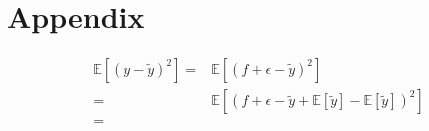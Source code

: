 \onecolumn
\setcounter{equation}{0}
\renewcommand\theequation{A.\arabic{equation}}
\section*{Appendix}
\label{sec:appendix}

\begin{align*}
	\mathds{E}\left[\left(y-\tilde{y}\right)^2\right] =& \mathds{E}\left[\left(f+\epsilon - \tilde{y}\right)^2\right] \\
	=& \mathds{E}\left[\left(f+\epsilon - \tilde{y} + \mathds{E}\left[\tilde{y}\right] - \mathds{E}\left[\tilde{y}\right]\right)^2\right] \\
	=& 
\end{align*}
